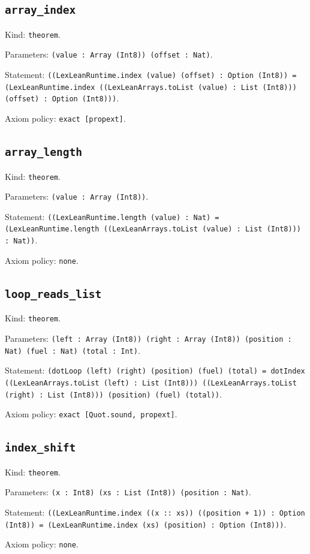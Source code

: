 \documentclass[11pt]{article}
\begin{document}
\subsection*{\texttt{array\_index}}
\noindent Kind: \texttt{theorem}.\par
\noindent Parameters: \texttt{(value : Array (Int8)) (offset : Nat)}.\par
\noindent Statement: \texttt{((LexLeanRuntime.index (value) (offset) : Option (Int8)) = (LexLeanRuntime.index ((LexLeanArrays.toList (value) : List (Int8))) (offset) : Option (Int8)))}.\par
\noindent Axiom policy: \texttt{exact [propext]}.\par
\subsection*{\texttt{array\_length}}
\noindent Kind: \texttt{theorem}.\par
\noindent Parameters: \texttt{(value : Array (Int8))}.\par
\noindent Statement: \texttt{((LexLeanRuntime.length (value) : Nat) = (LexLeanRuntime.length ((LexLeanArrays.toList (value) : List (Int8))) : Nat))}.\par
\noindent Axiom policy: \texttt{none}.\par
\subsection*{\texttt{loop\_reads\_list}}
\noindent Kind: \texttt{theorem}.\par
\noindent Parameters: \texttt{(left : Array (Int8)) (right : Array (Int8)) (position : Nat) (fuel : Nat) (total : Int)}.\par
\noindent Statement: \texttt{(dotLoop (left) (right) (position) (fuel) (total) = dotIndex ((LexLeanArrays.toList (left) : List (Int8))) ((LexLeanArrays.toList (right) : List (Int8))) (position) (fuel) (total))}.\par
\noindent Axiom policy: \texttt{exact [Quot.sound, propext]}.\par
\subsection*{\texttt{index\_shift}}
\noindent Kind: \texttt{theorem}.\par
\noindent Parameters: \texttt{(x : Int8) (xs : List (Int8)) (position : Nat)}.\par
\noindent Statement: \texttt{((LexLeanRuntime.index ((x :: xs)) ((position + 1)) : Option (Int8)) = (LexLeanRuntime.index (xs) (position) : Option (Int8)))}.\par
\noindent Axiom policy: \texttt{none}.\par
\end{document}
